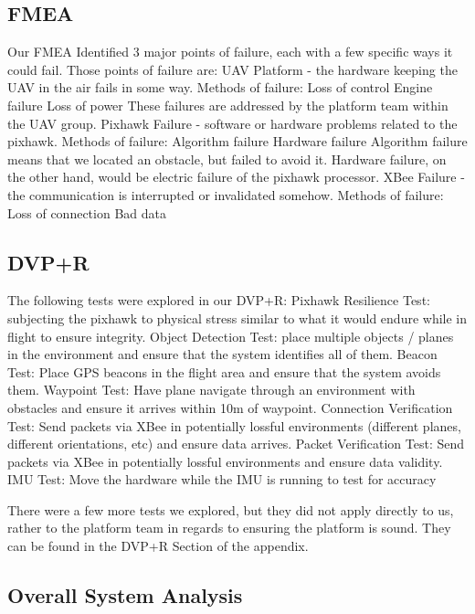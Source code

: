 \documentclass[12pt]{article}
\begin{document}
\subsection{FMEA}
Our FMEA Identified 3 major points of failure, each with a few specific ways it could fail. Those points of failure are: 
UAV Platform - the hardware keeping the UAV in the air fails in some way. Methods of failure:
Loss of control
Engine failure
Loss of power
These failures are addressed by the platform team within the UAV group.
Pixhawk Failure - software or hardware problems related to the pixhawk. Methods of failure:
Algorithm failure
Hardware failure
Algorithm failure means that we located an obstacle, but failed to avoid it. Hardware failure, on the other hand, would be electric failure of the pixhawk processor.
XBee Failure - the communication is interrupted or invalidated somehow. Methods of failure:
Loss of connection
Bad data

\subsection{DVP+R}
The following tests were explored in our DVP+R:
Pixhawk Resilience Test: subjecting the pixhawk to physical stress similar to what it would endure while in flight to ensure integrity.
Object Detection Test: place multiple objects / planes in the environment and ensure that the system identifies all of them.
Beacon Test: Place GPS beacons in the flight area and ensure that the system avoids them.
Waypoint Test: Have plane navigate through an environment with obstacles and ensure it arrives within 10m of waypoint.
Connection Verification Test: Send packets via XBee in potentially lossful environments (different planes, different orientations, etc) and ensure data arrives.
Packet Verification Test: Send packets via XBee in potentially lossful environments and ensure data validity.
IMU Test: Move the hardware while the IMU is running to test for accuracy

There were a few more tests we explored, but they did not apply directly to us, rather to the platform team in regards to ensuring the platform is sound. They can be found in the DVP+R Section of the appendix.

\subsection{Overall System Analysis}
\end{document}
